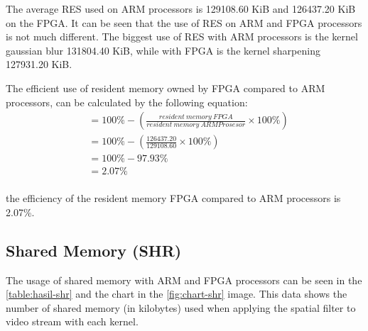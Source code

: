 The average RES used on ARM processors is 129108.60 KiB and 126437.20 KiB on the FPGA. It can be seen that the use of RES on ARM and FPGA processors is not much different. The biggest use of RES with ARM processors is the kernel gaussian blur 131804.40 KiB, while with FPGA is the kernel sharpening 127931.20 KiB.


The efficient use of resident memory owned by FPGA compared to ARM processors, can be calculated by the following equation:
\begin{equation*}
    \begin{split}
& = 100\% - \left( \frac{resident\ memory\ FPGA}{resident\ memory\ ARM Prosesor} \times 100\% \right) \\
& = 100\% - \left( \frac{126437.20}{129108.60} \times 100\% \right) \\
& = 100\% - 97.93\% \\
& = 2.07\% \\
    \end{split}
\end{equation*}

the efficiency of the resident memory FPGA compared to ARM processors is 2.07\%.


\subsection{Shared Memory (SHR)}


The usage of shared memory with ARM and FPGA processors can be seen in the \ref{table:hasil-shr} and the chart in the \ref{fig:chart-shr} image. This data shows the number of shared memory (in kilobytes) used when applying the spatial filter to video stream with each kernel.

